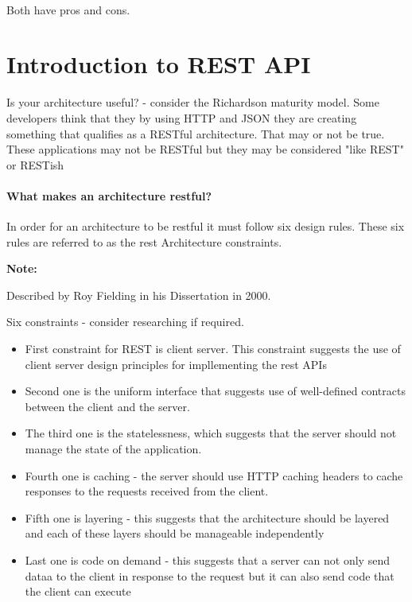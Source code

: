 \documentclass[a4paper, 11pt]{book}
\newenvironment{note}{
    \begin{siderule}
        \textbf{Note: }
        }{
    \end{siderule}
}
\begin{document}
    \paragraph{}
    Both have pros and cons.


    \section{Introduction to REST API}

    Is your architecture useful? - consider the Richardson maturity model.
    Some developers think that they by using HTTP and JSON they are creating something that qualifies as a RESTful architecture.
    That may or not be true.
    These applications may not be RESTful but they may be considered "like REST" or RESTish

    \paragraph{What makes an architecture restful?}
    In order for an architecture to be restful it must follow six design rules.
    These six rules are referred to as the rest Architecture constraints.

    \begin{note}
        Described by Roy Fielding in his Dissertation in 2000.
    \end{note}

    Six constraints - consider researching if required.
    \begin{itemize}
        \item First constraint for REST is client server. This constraint suggests the use of client server design principles for impllementing the rest APIs
        \item Second one is the uniform interface that suggests use of well-defined contracts between the client and the server.
        \item The third one is the statelessness, which suggests that the server should not manage the state of the application.
        \item Fourth one is caching - the server should use HTTP caching headers to cache responses to the requests received from the client.
        \item Fifth one is layering - this suggests that the architecture should be layered and each of these layers should be manageable independently
        \item Last one is code on demand - this suggests that a server can not only send dataa to the client in response to the request but it can also send code that the client can execute
    \end{itemize}
\end{document}
